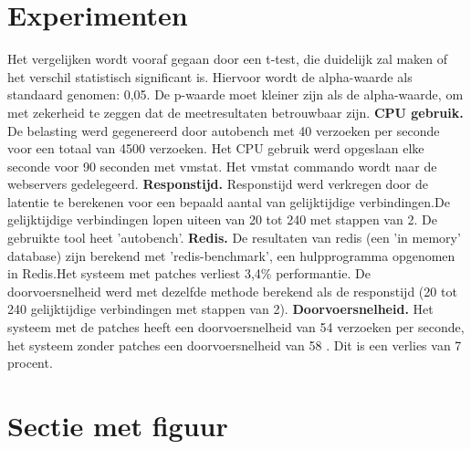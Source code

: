 \documentclass[a0,portrait]{a0poster}
\begin{document}
\begin{multicols}{2}
\section*{Experimenten}
\color{black}
Het vergelijken wordt vooraf gegaan door een t-test, die duidelijk zal maken of het verschil statistisch significant is. Hiervoor wordt de alpha-waarde als standaard genomen: 0,05. De p-waarde moet kleiner zijn als de alpha-waarde, om met zekerheid te zeggen dat de meetresultaten betrouwbaar zijn.
\newline\newline
\noindent\textbf{CPU gebruik.}
De belasting werd gegenereerd door autobench met 40 verzoeken per seconde voor een totaal van 4500 verzoeken. Het CPU gebruik werd opgeslaan elke seconde voor 90 seconden met vmstat. Het vmstat commando wordt naar de webservers gedelegeerd.
\newline\newline
\noindent\textbf{Responstijd.} Responstijd werd verkregen door de latentie te berekenen voor een bepaald aantal van gelijktijdige verbindingen.De gelijktijdige verbindingen lopen uiteen van 20 tot 240 met stappen van 2. De gebruikte tool heet ’autobench’.
\newline\newline
\noindent\textbf{Redis.} De resultaten van redis (een 'in memory' database) zijn berekend met ’redis-benchmark’, een hulpprogramma opgenomen in Redis.Het systeem met patches verliest 3,4\% performantie.
De doorvoersnelheid werd met dezelfde methode berekend als de responstijd (20 tot 240 gelijktijdige verbindingen met stappen van 2).
\newline\newline
\textbf{Doorvoersnelheid.}
Het systeem met de patches heeft een doorvoersnelheid van 54 verzoeken per seconde, het
systeem zonder patches een doorvoersnelheid van 58 . Dit is een verlies van 7 procent.


\color{HoGentAccent1} 
\section*{Sectie met figuur}
\color{black}



\end{multicols}
\end{document}
